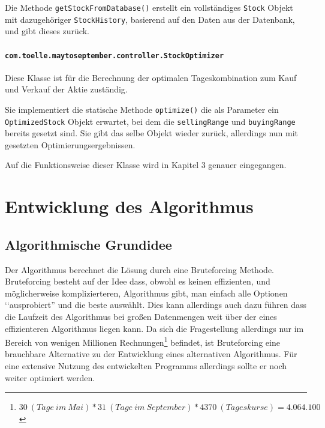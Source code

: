 \documentclass[12pt, a4paper, titlepage]{report}
\begin{document}
        		Die Methode \texttt{getStockFromDatabase()} erstellt ein vollständiges
        		\texttt{Stock} Objekt mit dazugehöriger \texttt{StockHistory}, basierend auf
        		den Daten aus der Datenbank, und gibt dieses zurück.
        		
        		\subsubsection{\texttt{com.toelle.maytoseptember.controller.StockOptimizer}}
        		Diese Klasse ist für die Berechnung der optimalen Tageskombination
        		zum Kauf und Verkauf der Aktie zuständig.
        		
        		Sie implementiert die statische Methode \texttt{optimize()} die als 
        		Parameter ein \texttt{OptimizedStock} Objekt erwartet, bei dem die
        		\texttt{sellingRange} und \texttt{buyingRange} bereits gesetzt sind.
        		Sie gibt das selbe Objekt wieder zurück, allerdings nun mit gesetzten
        		Optimierungsergebnissen.
        		
        		Auf die Funktionsweise dieser Klasse wird in Kapitel 3 genauer eingegangen.

    \chapter{Entwicklung des Algorithmus}

        \section{Algorithmische Grundidee}
            Der Algorithmus berechnet die Lösung durch eine Bruteforcing Methode.
            Bruteforcing besteht auf der Idee dass, obwohl es keinen
            effizienten, und möglicherweise komplizierteren, Algorithmus gibt, man
            einfach alle Optionen ‘‘ausprobiert'' und die beste auswählt. Dies kann
            allerdings auch dazu führen dass die Laufzeit des Algorithmus bei großen
            Datenmengen weit über der eines effizienteren Algorithmus liegen kann.
            Da sich die Fragestellung allerdings nur im Bereich von wenigen Millionen
            Rechnungen\footnote{$30~(Tage~im~Mai) * 31~(Tage~im~September) * 4370~
            (Tageskurse) = 4.064.100$} befindet, ist Bruteforcing eine brauchbare
            Alternative zu der Entwicklung eines alternativen Algorithmus.
   			Für eine extensive Nutzung des entwickelten Programms allerdings sollte
   			er noch weiter optimiert werden.
\end{document}

